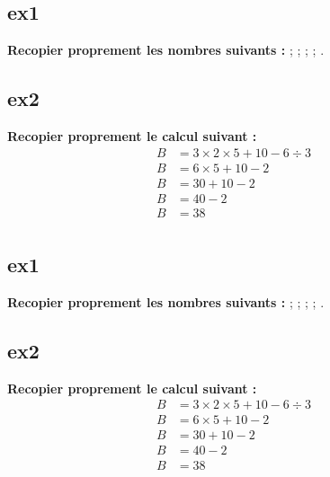 \documentclass[11pt]{article}
\begin{document}
\setlength{\columnseprule}{1pt}

\begin{multicols}{2}
    \subsection*{ex1}

    \textbf{Recopier proprement les nombres suivants :}
     ;  ;  ;  ; .


    \subsection*{ex2}

    \textbf{Recopier proprement le calcul suivant :}
    \begin{align*}
        B &= 3 \times 2 \times 5 + 10 - 6 \div 3  \\
        B &= 6 \times 5 + 10 - 2\\
        B &= 30 + 10 - 2 \\
        B &= 40 - 2\\
        B &= 38\\  
    \end{align*}
\end{multicols}

\vspace{1cm}

\begin{multicols}{2}
    \subsection*{ex1}
    
    \textbf{Recopier proprement les nombres suivants :}
     ;  ;  ;  ; .
        
    \subsection*{ex2}
    
    \textbf{Recopier proprement le calcul suivant :}
    \begin{align*}
        B &= 3 \times 2 \times 5 + 10 - 6 \div 3  \\
        B &= 6 \times 5 + 10 - 2\\
        B &= 30 + 10 - 2 \\
        B &= 40 - 2\\
        B &= 38\\  
    \end{align*}
\end{multicols}
\end{document}
